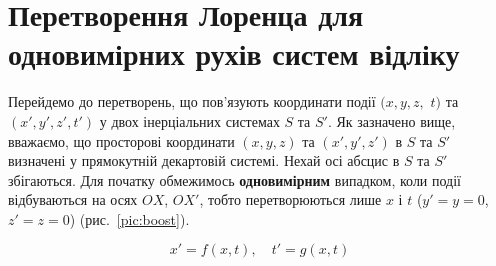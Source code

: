 \section{Перетворення Лоренца для одновимірних рухів систем відліку}

Перейдемо до перетворень, що пов'язують координати події $(x, y, z,$ $t)$ та $(x',y',z',t')$ у двох інерціальних
системах $S$ та $S'$. Як зазначено вище, вважаємо, що просторові координати $(x,y,z)$ та $(x',y',z')$ в $S$ та $S'$
визначені у прямокутній декартовій системі. Нехай осі абсцис в $S$ та $S'$ збігаються. Для початку обмежимось
\textbf{одновимірним} випадком, коли події відбуваються на осях $OX$, $OX'$, тобто перетворюються лише $x$ і $t$
($y'=y=0$, $z'=z=0$) (рис.~\ref{pic:boost}).

\begin{equation}\label{eq:LT_1_1}
	x'=f(x,t), \quad t'=g(x,t)
\end{equation}

